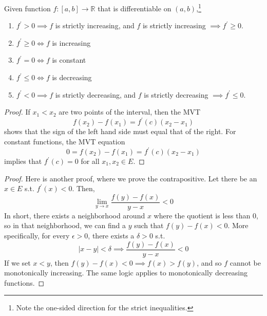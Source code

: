  \begin{theorem}
		\label{thm:der_mono_func}
		Given function $f: [a, b] \to \mathbb{R}$ that is differentiable on $(a, b)$,\footnote{Note the one-sided direction for the strict inequalities. }
    \begin{enumerate}
      \item $f^\prime > 0 \implies f$ is strictly increasing, and $f$ is strictly increasing $\implies f^\prime \geq 0$. 
      \item $f^\prime \geq 0 \iff f$ is increasing
      \item $f^\prime = 0 \iff f$ is constant
      \item $f^\prime \leq 0 \iff f$ is decreasing
      \item $f^\prime < 0 \implies f$ is strictly decreasing, and $f$ is strictly decreasing $\implies f^\prime \leq 0$. 
    \end{enumerate}
  \end{theorem}
  \begin{proof}
    If $x_1 < x_2$ are two points of the interval, then the MVT
    \begin{equation}
      f(x_2) - f(x_1) = f^\prime (c) (x_2 - x_1)
    \end{equation}
    shows that the sign of the left hand side must equal that of the right. For constant functions, the MVT equation 
    \begin{equation}
      0 = f(x_2) - f(x_1) = f^\prime (c) (x_2 - x_1)
    \end{equation}
    implies that $f^\prime (c) = 0$ for all $x_1, x_2 \in E$. 
  \end{proof}
	\begin{proof}
		Here is another proof, where we prove the contrapositive. Let there be an $x \in E$ s.t. $f^\prime (x) < 0$. Then, 
		\begin{equation}
			\lim_{y \to x} \frac{f(y) - f(x)}{y - x} < 0
		\end{equation}
		In short, there exists a neighborhood around $x$ where the quotient is less than $0$, so in that neighborhood, we can find a $y$ such that $f(y) - f(x) < 0$. More specifically, for every $\epsilon > 0$, there exists a $\delta > 0$ s.t. 
		\begin{equation}
			|x - y| < \delta \implies \frac{f(y) - f(x)}{y - x} < 0
		\end{equation}
		If we set $x < y$, then $f(y) - f(x) < 0 \implies f(x) > f(y)$, and so $f$ cannot be monotonically increasing. The same logic applies to monotonically decreasing functions. 
	\end{proof}

